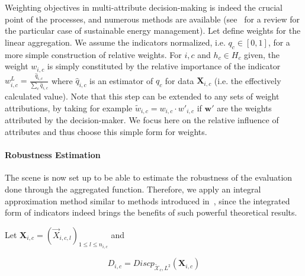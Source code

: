 \documentclass[runningheads,a4paper]{llncs2e/llncs}
\begin{document}
Weighting objectives in multi-attribute decision-making is indeed the crucial point of the processes, and numerous methods are available (see~\cite{wang2009review} for a review for the particular case of sustainable energy management). Let define weights for the linear aggregation. We assume the indicators normalized, i.e. $q_c \in [0,1]$, for a more simple construction of relative weights. For $i,c$ and $h_{c}\in H_{c}$ given, the weight $w_{i,c}$ is simply constituted by the relative importance of the indicator $w_{i,c}^{L}=\frac{\hat{q}_{i,c}}{\sum_{c}\hat{q}_{i,c}}$ where $\hat{q}_{i,c}$ is an estimator of $q_{c}$ for data $\mathbf{X}_{i,c}$ (i.e. the effectively calculated value). Note that this step can be extended to any sets of weight attributions, by taking for example $\tilde{w}_{i,c} = w_{i,c} \cdot w'_{i,c}$ if $\mathbf{w}'$ are the weights attributed by the decision-maker. We focus here on the relative influence of attributes and thus choose this simple form for weights.










\paragraph{Robustness Estimation}

The scene is now set up to be able to estimate the robustness of the evaluation done through the aggregated function. Therefore, we apply an integral approximation method similar to methods introduced in~\cite{varet2010developpement}, since the integrated form of indicators indeed brings the benefits of such powerful theoretical results.

Let $\mathbf{X}_{i,c}=(\vec{X}_{i,c,l})_{1\leq l\leq n_{i,c}}$ and

\[D_{i,c}=Discp_{\tilde{\mathcal{X}}_{c},L^2}(\mathbf{X}_{i,c})\]
\end{document}

